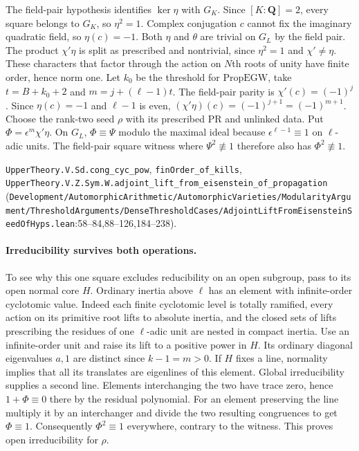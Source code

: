 The field-pair hypothesis identifies $\ker\eta$ with $G_K$. Since $[K:\mathbf Q]=2$, every square belongs to $G_K$, so $\eta^2=1$. Complex conjugation $c$ cannot fix the imaginary quadratic field, so $\eta(c)=-1$. Both $\eta$ and $\theta$ are trivial on $G_L$ by the field pair. The product $\chi'\eta$ is split as prescribed and nontrivial, since $\eta^2=1$ and $\chi'\ne\eta$. These characters that factor through the action on $N$th roots of unity have finite order, hence norm one. Let $k_0$ be the threshold for $\mathrm{PropEGW}$, take $t=B+k_0+2$ and $m=j+(\ell-1)t$. The field-pair parity is $\chi'(c)=(-1)^j$. Since $\eta(c)=-1$ and $\ell-1$ is even, $(\chi'\eta)(c)=(-1)^{j+1}=(-1)^{m+1}$. Choose the rank-two seed $\rho$ with its prescribed PR and unlinked data. Put $\Phi=\epsilon^m\chi'\eta$. On $G_L$, $\Phi\equiv\Psi$ modulo the maximal ideal because $\epsilon^{\ell-1}\equiv1$ on $\ell$-adic units. The field-pair square witness where $\Psi^2\not\equiv1$ therefore also has $\Phi^2\not\equiv1$.

{\footnotesize \nolinkurl{UpperTheory.V.Sd.cong_cyc_pow}, \nolinkurl{finOrder_of_kills}, \nolinkurl{UpperTheory.V.Z.Sym.W.adjoint_lift_from_eisenstein_of_propagation} (\nolinkurl{Development/AutomorphicArithmetic/AutomorphicVarieties/ModularityArgument/ThresholdArguments/DenseThresholdCases/AdjointLiftFromEisensteinSeedOfHyps.lean}\allowbreak:58--84,88--126,184--238).}

\paragraph{Irreducibility survives both operations.}
To see why this one square excludes reducibility on an open subgroup, pass to its open normal core $H$. Ordinary inertia above $\ell$ has an element with infinite-order cyclotomic value. Indeed each finite cyclotomic level is totally ramified, every action on its primitive root lifts to absolute inertia, and the closed sets of lifts prescribing the residues of one $\ell$-adic unit are nested in compact inertia. Use an infinite-order unit and raise its lift to a positive power in $H$. Its ordinary diagonal eigenvalues $a,1$ are distinct since $k-1=m>0$. If $H$ fixes a line, normality implies that all its translates are eigenlines of this element. Global irreducibility supplies a second line. Elements interchanging the two have trace zero, hence $1+\Phi\equiv0$ there by the residual polynomial. For an element preserving the line multiply it by an interchanger and divide the two resulting congruences to get $\Phi\equiv1$. Consequently $\Phi^2\equiv1$ everywhere, contrary to the witness. This proves open irreducibility for $\rho$.

